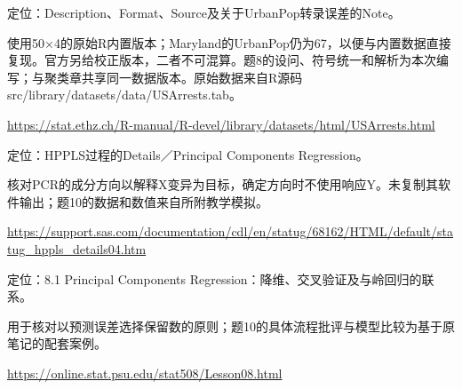 \par\noindent\begin{minipage}{\linewidth}\label{src:M1-USARRESTS}
\par
定位：Description、Format、Source及关于UrbanPop转录误差的Note。\par
使用50×4的原始R内置版本；Maryland的UrbanPop仍为67，以便与内置数据直接复现。官方另给校正版本，二者不可混算。题8的设问、符号统一和解析为本次编写；与聚类章共享同一数据版本。原始数据来自R源码src/library/datasets/data/USArrests.tab。\par
{\small\url{https://stat.ethz.ch/R-manual/R-devel/library/datasets/html/USArrests.html}}\par
\end{minipage}\par\medskip

\par\noindent\begin{minipage}{\linewidth}\label{src:M1-SAS-PCR}
\par
定位：HPPLS过程的Details／Principal Components Regression。\par
核对PCR的成分方向以解释X变异为目标，确定方向时不使用响应Y。未复制其软件输出；题10的数据和数值来自所附教学模拟。\par
{\small\url{https://support.sas.com/documentation/cdl/en/statug/68162/HTML/default/statug_hppls_details04.htm}}\par
\end{minipage}\par\medskip

\par\noindent\begin{minipage}{\linewidth}\label{src:M1-PSU-PCR}
\par
定位：8.1 Principal Components Regression：降维、交叉验证及与岭回归的联系。\par
用于核对以预测误差选择保留数的原则；题10的具体流程批评与模型比较为基于原笔记的配套案例。\par
{\small\url{https://online.stat.psu.edu/stat508/Lesson08.html}}\par
\end{minipage}\par\medskip

